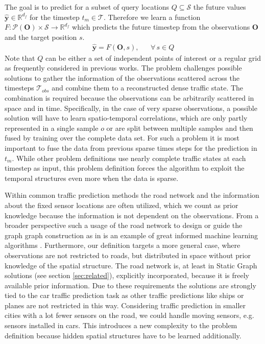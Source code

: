 The goal is to predict for a subset of query locations $Q \subseteq \mathcal{S}$ the future values $\hat{\bm{y}} \in \mathbb{R}^{d_f}$ for the timestep $t_m \in \mathcal{T}$.
Therefore we learn a function $F: \mathcal{P}(\bm{O}) \times \mathcal{S} \to \mathbb{R}^{d_f}$ which predicts the future timestep from the observations $\mathbf{O}$ and the target position $s$. 
\begin{align}
    \hat{\bm{y}} = F(\bm{O}, s) ,& &  \forall \, s \in Q    
\end{align}
Note that $Q$ can be either a set of independent points of interest or a regular grid as frequently considered in previous works.
The problem challenges possible solutions to gather the information of the observations scattered across the timesteps $\mathcal{T}_{obs}$ and combine them to a reconstructed dense traffic state.
The combination is required because the observations can be arbitrarily scattered in space and in time.
Specifically, in the case of very sparse observations, a possible solution will have to learn spatio-temporal correlations, which are only partly represented in a single sample $o$ or are split between multiple samples and then fused by training over the complete data set.
For such a problem it is most important to fuse the data from previous sparse times steps for the prediction in $t_m$. 
While other problem definitions use nearly complete traffic states at each timestep as input, this problem definition forces the algorithm to exploit the temporal structures even more when the data is sparse.

Within common traffic prediction methods the road network and the information about the fixed sensor locations are often utilized, which we count as prior knowledge because the information is not dependent on the observations.
From a broader perspective such a usage of the road network to design or guide the graph graph construction as in \cite{Yu18, Zhou20} is an example of great informed machine learning algorithms \cite{vonrueden2023}.
Furthermore, our definition targets a more general case, where observations are not restricted to roads, but distributed in space without prior knowledge of the spatial structure. 
The road network is, at least in Static Graph solutions (see section \ref{sec:related}), explicitly incorporated, because it is freely available prior information.
Due to these requirements the solutions are strongly tied to the car traffic prediction task as other traffic predictions like ships or planes are not restricted in this way.
Considering traffic prediction in smaller cities with a lot fewer sensors on the road, we could handle moving sensors, e.g. sensors installed in cars.
This introduces a new complexity to the problem definition because hidden spatial structures have to be learned additionally.




